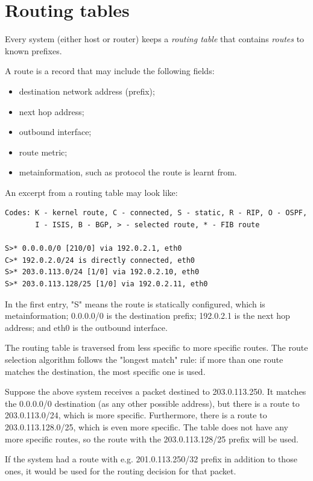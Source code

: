 \section{Routing tables}

Every system (either host or router) keeps a \emph{routing table} that contains \emph{routes} to known prefixes.

A route is a record that may include the following fields:
\begin{itemize}
  \item destination network address (prefix);
  \item next hop address;
  \item outbound interface;
  \item route metric;
  \item metainformation, such as protocol the route is learnt from.
\end{itemize}

An excerpt from a routing table may look like:
\begin{verbatim}
Codes: K - kernel route, C - connected, S - static, R - RIP, O - OSPF,
       I - ISIS, B - BGP, > - selected route, * - FIB route

S>* 0.0.0.0/0 [210/0] via 192.0.2.1, eth0
C>* 192.0.2.0/24 is directly connected, eth0
S>* 203.0.113.0/24 [1/0] via 192.0.2.10, eth0
S>* 203.0.113.128/25 [1/0] via 192.0.2.11, eth0
\end{verbatim}

In the first entry, "S" means the route is statically configured, which is metainformation;
0.0.0.0/0 is the destination prefix; 192.0.2.1 is the next hop address; and eth0 is the
outbound interface.

The routing table is traversed from less specific to more specific routes. The route selection algorithm follows the "longest match" rule: if more than one route matches the destination,
the most specific one is used.

Suppose the above system receives a packet destined to 203.0.113.250. It matches the 0.0.0.0/0
destination (as any other possible address), but there is a route to 203.0.113.0/24, which is
more specific. Furthermore, there is a route to 203.0.113.128.0/25, which is even more specific.
The table does not have any more specific routes, so the route with the 203.0.113.128/25 prefix 
will be used.

If the system had a route with e.g. 201.0.113.250/32 prefix in addition to those ones, it would
be used for the routing decision for that packet.



